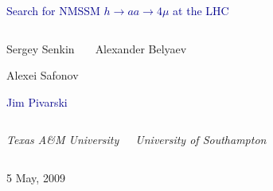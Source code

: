 \documentclass[compress]{beamer}
\begin{document}
\begin{frame}
\vfill
\begin{center}
\textcolor{darkblue}{\Large Search for NMSSM $h \to a a \to 4\mu$ at the LHC}

\vfill
\begin{columns}
\begin{center}
\large
Sergey Senkin

\vspace{0.2 cm}
Alexei Safonov

\vspace{0.2 cm}
\textcolor{darkblue}{Jim Pivarski}
\end{center}

\begin{center}
\large
Alexander Belyaev
\end{center}
\end{columns}

\begin{columns}
\begin{center}
\scriptsize
{\it Texas A\&M University}
\end{center}
\begin{center}
\scriptsize
{\it University of Southampton}
\end{center}
\end{columns}

\vfill
 5 May, 2009

\end{center}
\end{frame}


\small
\end{document}
